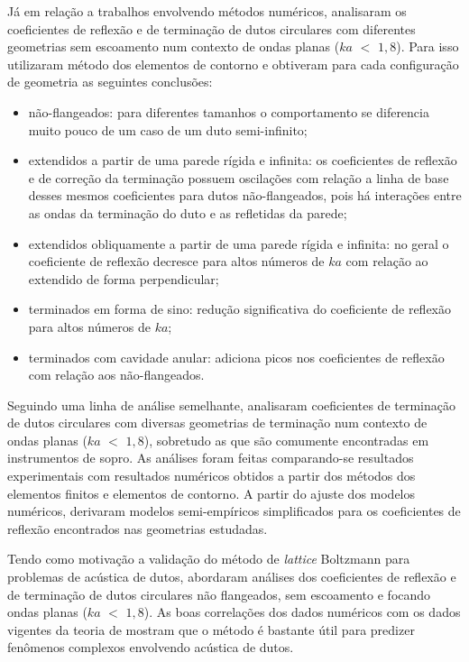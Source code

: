 Já em relação a trabalhos envolvendo métodos numéricos,  analisaram os coeficientes de reflexão e de terminação de dutos circulares com diferentes geometrias sem escoamento num contexto de ondas planas ($ka$ $<$ $1,8$). Para isso utilizaram método dos elementos de contorno e obtiveram para cada configuração de geometria as seguintes conclusões:
\begin{itemize}
  \item não-flangeados: para diferentes tamanhos o comportamento se diferencia muito pouco de um caso de um duto semi-infinito;
  \item extendidos a partir de uma parede rígida e infinita: os coeficientes de reflexão e de correção da terminação possuem oscilações com relação a linha de base desses mesmos coeficientes para dutos não-flangeados, pois há interações entre as ondas da terminação do duto e as refletidas da parede;
  \item extendidos obliquamente a partir de uma parede rígida e infinita: no geral o coeficiente de reflexão decresce para altos números de $ka$ com relação ao extendido de forma perpendicular;
  \item terminados em forma de sino: redução significativa do coeficiente de reflexão para altos números de $ka$;
  \item terminados com cavidade anular: adiciona picos nos coeficientes de reflexão com relação aos não-flangeados.
\end{itemize}

Seguindo uma linha de análise semelhante,  analisaram coeficientes de terminação de dutos circulares com diversas geometrias de terminação num contexto de ondas planas ($ka$ $<$ $1,8$), sobretudo as que são comumente encontradas em instrumentos de sopro. As análises foram feitas comparando-se resultados experimentais com resultados numéricos obtidos a partir dos métodos dos elementos finitos e elementos de contorno. A partir do ajuste dos modelos numéricos, derivaram modelos semi-empíricos simplificados para os coeficientes de reflexão encontrados nas geometrias estudadas. 

Tendo como motivação a validação do método de \textit{lattice} Boltzmann para problemas de acústica de dutos,  abordaram análises dos coeficientes de reflexão e de terminação de dutos circulares não flangeados, sem escoamento e focando ondas planas ($ka$ $<$ $1,8$). As boas correlações dos dados numéricos com os dados vigentes da teoria de  mostram que o método é bastante útil para predizer fenômenos complexos envolvendo acústica de dutos.

